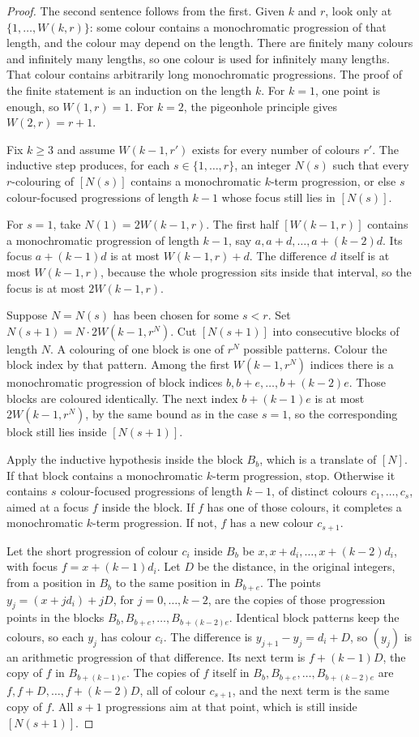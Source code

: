 \begin{proof}
The second sentence follows from the first. Given $k$ and $r$, look only at $\{1,\ldots,W(k,r)\}$: some colour contains a monochromatic progression of that length, and the colour may depend on the length. There are finitely many colours and infinitely many lengths, so one colour is used for infinitely many lengths. That colour contains arbitrarily long monochromatic progressions. The proof of the finite statement is an induction on the length $k$. For $k=1$, one point is enough, so $W(1,r)=1$. For $k=2$, the pigeonhole principle gives $W(2,r)=r+1$.

Fix $k\ge 3$ and assume $W(k-1,r')$ exists for every number of colours $r'$. The inductive step produces, for each $s\in\{1,\ldots,r\}$, an integer $N(s)$ such that every $r$-colouring of $[N(s)]$ contains a monochromatic $k$-term progression, or else $s$ colour-focused progressions of length $k-1$ whose focus still lies in $[N(s)]$.

For $s=1$, take $N(1)=2W(k-1,r)$. The first half $[W(k-1,r)]$ contains a monochromatic progression of length $k-1$, say $a,a+d,\ldots,a+(k-2)d$. Its focus $a+(k-1)d$ is at most $W(k-1,r)+d$. The difference $d$ itself is at most $W(k-1,r)$, because the whole progression sits inside that interval, so the focus is at most $2W(k-1,r)$.

Suppose $N=N(s)$ has been chosen for some $s<r$. Set $N(s+1)=N\cdot 2W(k-1,r^{N})$. Cut $[N(s+1)]$ into consecutive blocks of length $N$. A colouring of one block is one of $r^{N}$ possible patterns. Colour the block index by that pattern. Among the first $W(k-1,r^{N})$ indices there is a monochromatic progression of block indices $b,b+e,\ldots,b+(k-2)e$. Those blocks are coloured identically. The next index $b+(k-1)e$ is at most $2W(k-1,r^{N})$, by the same bound as in the case $s=1$, so the corresponding block still lies inside $[N(s+1)]$.

Apply the inductive hypothesis inside the block $B_b$, which is a translate of $[N]$. If that block contains a monochromatic $k$-term progression, stop. Otherwise it contains $s$ colour-focused progressions of length $k-1$, of distinct colours $c_1,\ldots,c_s$, aimed at a focus $f$ inside the block. If $f$ has one of those colours, it completes a monochromatic $k$-term progression. If not, $f$ has a new colour $c_{s+1}$.

Let the short progression of colour $c_i$ inside $B_b$ be $x,x+d_i,\ldots,x+(k-2)d_i$, with focus $f=x+(k-1)d_i$. Let $D$ be the distance, in the original integers, from a position in $B_b$ to the same position in $B_{b+e}$. The points $y_j=(x+jd_i)+jD$, for $j=0,\ldots,k-2$, are the copies of those progression points in the blocks $B_b,B_{b+e},\ldots,B_{b+(k-2)e}$. Identical block patterns keep the colours, so each $y_j$ has colour $c_i$. The difference is $y_{j+1}-y_j=d_i+D$, so $(y_j)$ is an arithmetic progression of that difference. Its next term is $f+(k-1)D$, the copy of $f$ in $B_{b+(k-1)e}$. The copies of $f$ itself in $B_b,B_{b+e},\ldots,B_{b+(k-2)e}$ are $f,f+D,\ldots,f+(k-2)D$, all of colour $c_{s+1}$, and the next term is the same copy of $f$. All $s+1$ progressions aim at that point, which is still inside $[N(s+1)]$.


\end{proof}
